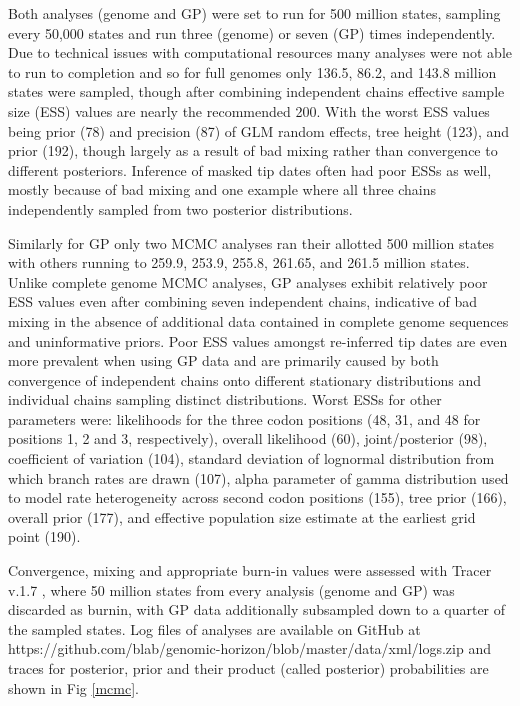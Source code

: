 \documentclass{bmcart}
\begin{document}
Both analyses (genome and GP) were set to run for 500 million states, sampling  every 50,000 states and run three (genome) or seven (GP) times independently.
Due to technical issues with computational resources many analyses were not able to run to completion and so for full genomes only 136.5, 86.2, and 143.8 million states were sampled, though after combining independent chains effective sample size (ESS) values are nearly the recommended 200.
With the worst ESS values being prior (78) and precision (87) of GLM random effects, tree height (123), and prior (192), though largely as a result of bad mixing rather than convergence to different posteriors.
Inference of masked tip dates often had poor ESSs as well, mostly because of bad mixing and one example where all three chains independently sampled from two posterior distributions.

Similarly for GP only two MCMC analyses ran their allotted 500 million states with others running to 259.9, 253.9, 255.8, 261.65, and 261.5 million states.
Unlike complete genome MCMC analyses, GP analyses exhibit relatively poor ESS values even after combining seven independent chains, indicative of bad mixing in the absence of additional data contained in complete genome sequences and uninformative priors.
Poor ESS values amongst re-inferred tip dates are even more prevalent when using GP data and are primarily caused by both convergence of independent chains onto different stationary distributions and individual chains sampling distinct distributions.
Worst ESSs for other parameters were: likelihoods for the three codon positions (48, 31, and 48 for positions 1, 2 and 3, respectively), overall likelihood (60), joint/posterior (98), coefficient of variation (104), standard deviation of lognormal distribution from which branch rates are drawn (107), alpha parameter of gamma distribution used to model rate heterogeneity across second codon positions (155), tree prior (166), overall prior (177), and effective population size estimate at the earliest grid point (190).

Convergence, mixing and appropriate burn-in values were assessed with Tracer v.1.7 \cite{rambaut_posterior_2018}, where 50 million states from every analysis (genome and GP) was discarded as burnin, with GP data additionally subsampled down to a quarter of the sampled states.
Log files of analyses are available on GitHub at https://github.com/blab/genomic-horizon/blob/master/data/xml/logs.zip and traces for posterior, prior and their product (called posterior) probabilities are shown in Fig \ref{mcmc}.
\end{document}
